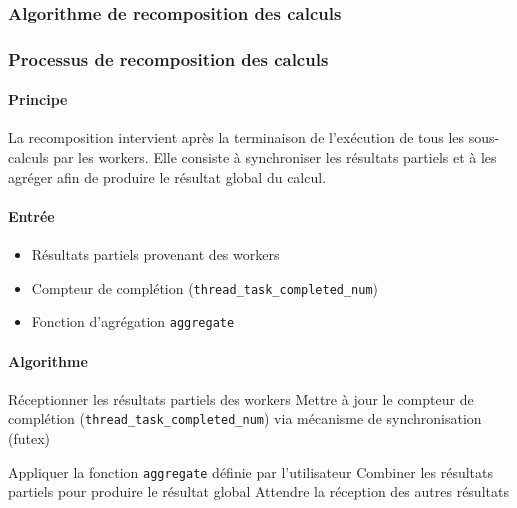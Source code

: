 \documentclass[12pt,a4paper]{report}
\theoremstyle{definition}
\begin{document}
\subsubsection{Algorithme de recomposition des calculs}

\subsubsection{Processus de recomposition des calculs}

\paragraph{Principe}
La recomposition intervient après la terminaison de l’exécution de tous les sous-calculs par les workers. Elle consiste à synchroniser les résultats partiels et à les agréger afin de produire le résultat global du calcul.

\paragraph{Entrée}
\begin{itemize}
    \item[$\bullet$] Résultats partiels provenant des workers
    \item [$\bullet$]Compteur de complétion (\texttt{thread\_task\_completed\_num})
    \item [$\bullet$]Fonction d’agrégation \texttt{aggregate}
\end{itemize}

\paragraph{Algorithme}

\begin{algorithm}[H]
\caption{Processus de recomposition des calculs}
\label{alg:recomposition}

\begin{algorithmic}[1]

\State Réceptionner les résultats partiels des workers
\State Mettre à jour le compteur de complétion (\texttt{thread\_task\_completed\_num}) via mécanisme de synchronisation (futex)

    \State Appliquer la fonction \texttt{aggregate} définie par l’utilisateur
    \State Combiner les résultats partiels pour produire le résultat global
\Else
    \State Attendre la réception des autres résultats
\EndIf

\end{algorithmic}
\end{algorithm}
\end{document}
